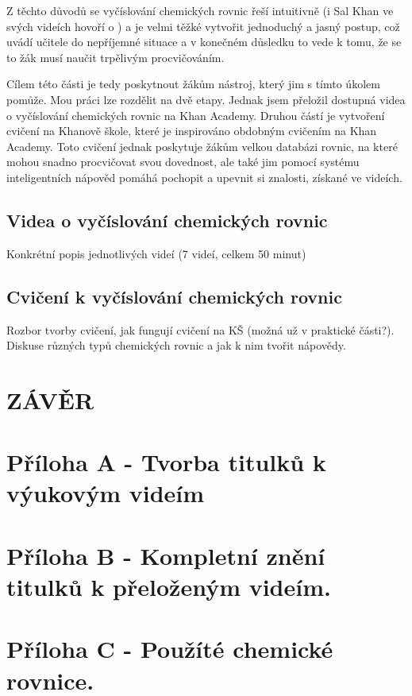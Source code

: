 \documentclass[a4paper, 12pt]{article}
\begin{document}
Z těchto důvodů se vyčíslování chemických rovnic řeší intuitivně (i Sal Khan ve svých videích hovoří o ) a je velmi těžké vytvořit jednoduchý a jasný postup, což uvádí učitele do nepříjemné situace a v konečném důsledku to vede k tomu, že se to žák musí naučit trpělivým procvičováním. 

Cílem této části je tedy poskytnout žákům nástroj, který jim s tímto úkolem pomůže. Mou práci lze rozdělit na dvě etapy. Jednak jsem přeložil dostupná videa o vyčíslování chemických rovnic na Khan Academy. Druhou částí je vytvoření cvičení na Khanově škole, které je inspirováno obdobným cvičením na Khan Academy. Toto cvičení jednak poskytuje žákům velkou databázi rovnic, na které mohou snadno procvičovat svou dovednost, ale také jim pomocí systému inteligentních nápověd pomáhá pochopit a upevnit si znalosti, získané ve videích. 

\subsection{Videa o vyčíslování chemických rovnic}
Konkrétní popis jednotlivých videí (7 videí, celkem 50 minut)

\subsection{Cvičení k vyčíslování chemických rovnic}
Rozbor tvorby cvičení, jak fungují cvičení na KŠ (možná už v praktické části?).
Diskuse různých typů chemických rovnic a jak k nim tvořit nápovědy.

\newpage
\section{ZÁVĚR}


\newpage
{}



\newpage

\appendix

\section{Příloha A - Tvorba titulků k výukovým videím}
\label{Priloha:titulky}

\section{Příloha B - Kompletní znění titulků k přeloženým videím.}

\section{Příloha C - Použíté chemické rovnice.}
\end{document}
